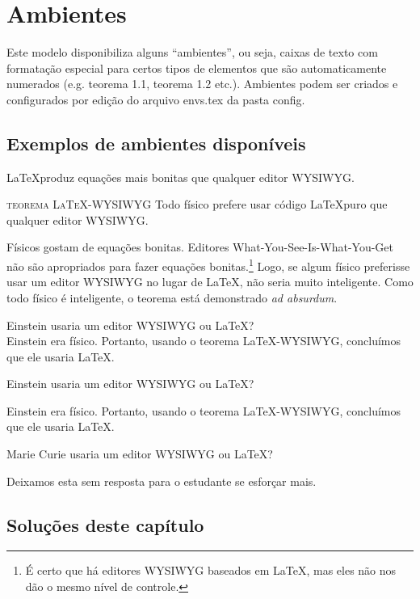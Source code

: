 \chapter{Ambientes}

\thispagestyle{empty}

Este modelo disponibiliza alguns ``ambientes'', ou seja, caixas de texto com formatação especial para certos tipos de elementos que são automaticamente numerados (e.g. teorema 1.1, teorema 1.2 etc.). Ambientes podem ser criados e configurados por edição do arquivo envs.tex da pasta config.

\section{Exemplos de ambientes disponíveis}

\begin{axiom}
    \LaTeX produz equações mais bonitas que qualquer editor WYSIWYG.
\end{axiom}

\begin{theorem}\textsc{teorema LaTeX-WYSIWYG}
    Todo físico prefere usar código \LaTeX puro que qualquer editor WYSIWYG.
\end{theorem}

\index{\LaTeX} %

\begin{demonstration}
    Físicos gostam de equações bonitas. Editores What-You-See-Is-What-You-Get não são apropriados para fazer equações bonitas.\footnote{É certo que há editores WYSIWYG baseados em \LaTeX, mas eles não nos dão o mesmo nível de controle.} Logo, se algum físico preferisse usar um editor WYSIWYG no lugar de \LaTeX, não seria muito inteligente. Como todo físico é inteligente, o teorema está demonstrado \textit{ad absurdum}.
\end{demonstration}

\begin{example}
    Einstein usaria um editor WYSIWYG ou \LaTeX? \\
    Einstein era físico. Portanto, usando o teorema LaTeX-WYSIWYG, concluímos que ele usaria \LaTeX.
\end{example}

\begin{question}
    Einstein usaria um editor WYSIWYG ou \LaTeX?
\end{question}

\begin{solution}
    Einstein era físico. Portanto, usando o teorema LaTeX-WYSIWYG, concluímos que ele usaria \LaTeX.
\end{solution}

\begin{question}
    Marie Curie usaria um editor WYSIWYG ou \LaTeX?
\end{question}

\begin{solution}
    Deixamos esta sem resposta para o estudante se esforçar mais.
\end{solution}

\clearpage

\section{Soluções deste capítulo}

\printsolutions